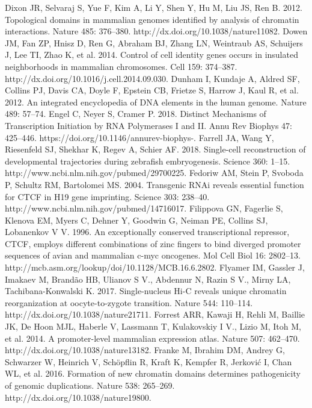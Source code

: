 \begin{thebibliography}{1}
	 Dixon JR, Selvaraj S, Yue F, Kim A, Li Y, Shen Y, Hu M, Liu JS, Ren B. 2012. Topological domains in mammalian genomes identified by analysis of chromatin interactions. Nature 485: 376–380. http://dx.doi.org/10.1038/nature11082.
	 Dowen JM, Fan ZP, Hnisz D, Ren G, Abraham BJ, Zhang LN, Weintraub AS, Schuijers J, Lee TI, Zhao K, et al. 2014. Control of cell identity genes occurs in insulated neighborhoods in mammalian chromosomes. Cell 159: 374–387. http://dx.doi.org/10.1016/j.cell.2014.09.030.
	 Dunham I, Kundaje A, Aldred SF, Collins PJ, Davis CA, Doyle F, Epstein CB, Frietze S, Harrow J, Kaul R, et al. 2012. An integrated encyclopedia of DNA elements in the human genome. Nature 489: 57–74.
	 Engel C, Neyer S, Cramer P. 2018. Distinct Mechanisms of Transcription Initiation by RNA Polymerases I and II. Annu Rev Biophys 47: 425–446. https://doi.org/10.1146/annurev-biophys-.
	 Farrell JA, Wang Y, Riesenfeld SJ, Shekhar K, Regev A, Schier AF. 2018. Single-cell reconstruction of developmental trajectories during zebrafish embryogenesis. Science 360: 1–15. http://www.ncbi.nlm.nih.gov/pubmed/29700225.
	 Fedoriw AM, Stein P, Svoboda P, Schultz RM, Bartolomei MS. 2004. Transgenic RNAi reveals essential function for CTCF in H19 gene imprinting. Science 303: 238–40. http://www.ncbi.nlm.nih.gov/pubmed/14716017.
	 Filippova GN, Fagerlie S, Klenova EM, Myers C, Dehner Y, Goodwin G, Neiman PE, Collins SJ, Lobanenkov V V. 1996. An exceptionally conserved transcriptional repressor, CTCF, employs different combinations of zinc fingers to bind diverged promoter sequences of avian and mammalian c-myc oncogenes. Mol Cell Biol 16: 2802–13. http://mcb.asm.org/lookup/doi/10.1128/MCB.16.6.2802.
	 Flyamer IM, Gassler J, Imakaev M, Brandão HB, Ulianov S V., Abdennur N, Razin S V., Mirny LA, Tachibana-Konwalski K. 2017. Single-nucleus Hi-C reveals unique chromatin reorganization at oocyte-to-zygote transition. Nature 544: 110–114. http://dx.doi.org/10.1038/nature21711.
	 Forrest ARR, Kawaji H, Rehli M, Baillie JK, De Hoon MJL, Haberle V, Lassmann T, Kulakovskiy I V., Lizio M, Itoh M, et al. 2014. A promoter-level mammalian expression atlas. Nature 507: 462–470. http://dx.doi.org/10.1038/nature13182.
	 Franke M, Ibrahim DM, Andrey G, Schwarzer W, Heinrich V, Schöpflin R, Kraft K, Kempfer R, Jerković I, Chan WL, et al. 2016. Formation of new chromatin domains determines pathogenicity of genomic duplications. Nature 538: 265–269. http://dx.doi.org/10.1038/nature19800.

\end{thebibliography}
